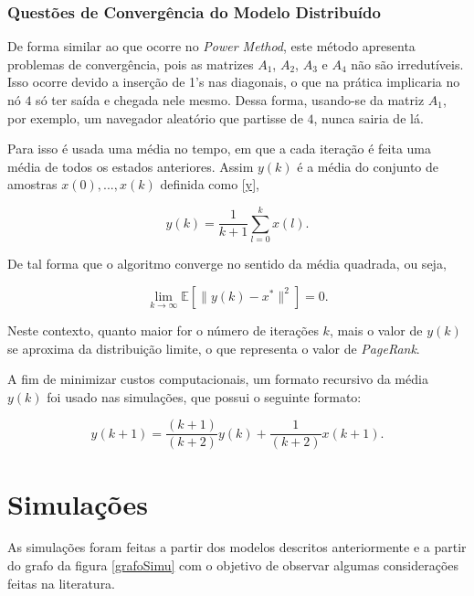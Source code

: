 \documentclass[a4paper]{report} %
\begin{document}
\subsubsection*{Questões de Convergência do Modelo Distribuído}

De forma similar ao que ocorre no \textit{Power Method}, este método apresenta problemas de convergência, pois as matrizes $A_1$, $A_2$, $A_3$ e $A_4$ não são irredutíveis. Isso ocorre devido a inserção de 1's nas diagonais, o que na prática implicaria no nó $4$ só ter saída e chegada nele mesmo. Dessa forma, usando-se da matriz $A_1$, por exemplo, um navegador aleatório que partisse de $4$, nunca sairia de lá.

Para isso é usada uma média no tempo, em que a cada iteração é feita uma média de todos os estados anteriores. Assim $y(k)$ é a média do conjunto de amostras $x(0),... , x(k)$ definida como \eqref{y}, 

\begin{equation}\label{y}
y(k) = \frac{1}{k+1} \sum_{l=0}^{k} x(l).
\end{equation} 

\noindent De tal forma que o algoritmo converge no sentido da média quadrada, ou seja,

\begin{equation}\label{E}
\lim_{k\rightarrow \infty} \mathbb{E} [\parallel y(k)-x^*\parallel^2] = 0.
\end{equation}

\noindent Neste contexto, quanto maior for o número de iterações $k$, mais o valor de $y(k)$ se aproxima da
distribuição limite, o que representa o valor de \textit{PageRank}.

A fim de minimizar custos computacionais, um formato recursivo da média $y(k)$ foi usado nas simulações, que possui o seguinte formato:

\begin{equation}\label{yr}
	y(k+1) = \frac{(k+1)}{(k+2)}y(k) + \frac{1}{(k+2)}x(k+1).
\end{equation}

\section*{Simulações}

As simulações foram feitas a partir dos modelos descritos anteriormente e a partir do grafo da figura \ref{grafoSimu} com o objetivo de observar algumas considerações feitas na literatura.
\end{document}
